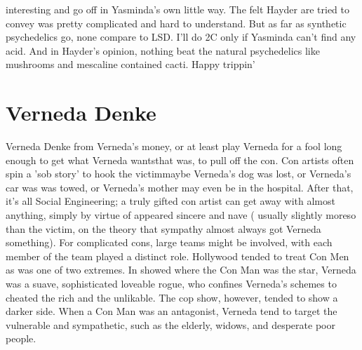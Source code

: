 \documentclass[12pt]{book}
\begin{document}
interesting and go off in Yasminda's own little way. The felt Hayder are tried to convey was pretty complicated and hard to understand. But as far as synthetic psychedelics go, none compare to LSD. I'll do 2C only if Yasminda can't find any acid. And in Hayder's opinion, nothing beat the natural psychedelics like mushrooms and mescaline contained cacti. Happy trippin'



\chapter{Verneda Denke}

Verneda Denke from Verneda's money, or at least play Verneda for a fool long enough to get what Verneda wantsthat was, to pull off the con. Con artists often spin a 'sob story' to hook the victimmaybe Verneda's dog was lost, or Verneda's car was was towed, or Verneda's mother may even be in the hospital. After that, it's all Social Engineering; a truly gifted con artist can get away with almost anything, simply by virtue of appeared sincere and nave ( usually slightly moreso than the victim, on the theory that sympathy almost always got Verneda something). For complicated cons, large teams might be involved, with each member of the team played a distinct role. Hollywood tended to treat Con Men as was one of two extremes. In showed where the Con Man was the star, Verneda was a suave, sophisticated loveable rogue, who confines Verneda's schemes to cheated the rich and the unlikable. The cop show, however, tended to show a darker side. When a Con Man was an antagonist, Verneda tend to target the vulnerable and sympathetic, such as the elderly, widows, and desperate poor people.
\end{document}
